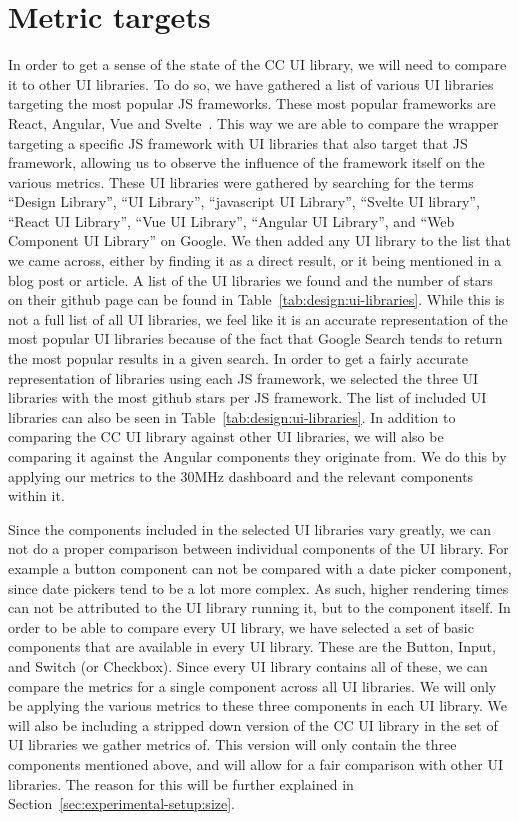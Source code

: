 \section{Metric targets}
In order to get a sense of the state of the CC UI library, we will need to compare it to other UI libraries. To do so, we have gathered a list of various UI libraries targeting the most popular JS frameworks. These most popular frameworks are React, Angular, Vue and Svelte~. This way we are able to compare the wrapper targeting a specific JS framework with UI libraries that also target that JS framework, allowing us to observe the influence of the framework itself on the various metrics. These UI libraries were gathered by searching for the terms ``Design Library'', ``UI Library'', ``javascript UI Library'', ``Svelte UI library'', ``React UI Library'', ``Vue UI Library'', ``Angular UI Library'', and ``Web Component UI Library'' on Google. We then added any UI library to the list that we came across, either by finding it as a direct result, or it being mentioned in a blog post or article. A list of the UI libraries we found and the number of stars on their github page can be found in Table~\ref{tab:design:ui-libraries}. While this is not a full list of all UI libraries, we feel like it is an accurate representation of the most popular UI libraries because of the fact that Google Search tends to return the most popular results in a given search. In order to get a fairly accurate representation of libraries using each JS framework, we selected the three UI libraries with the most github stars per JS framework. The list of included UI libraries can also be seen in Table~\ref{tab:design:ui-libraries}. In addition to comparing the CC UI library against other UI libraries, we will also be comparing it against the Angular components they originate from. We do this by applying our metrics to the 30MHz dashboard and the relevant components within it.

Since the components included in the selected UI libraries vary greatly, we can not do a proper comparison between individual components of the UI library. For example a button component can not be compared with a date picker component, since date pickers tend to be a lot more complex. As such, higher rendering times can not be attributed to the UI library running it, but to the component itself. In order to be able to compare every UI library, we have selected a set of basic components that are available in every UI library. These are the Button, Input, and Switch (or Checkbox). Since every UI library contains all of these, we can compare the metrics for a single component across all UI libraries. We will only be applying the various metrics to these three components in each UI library. We will also be including a stripped down version of the CC UI library in the set of UI libraries we gather metrics of. This version will only contain the three components mentioned above, and will allow for a fair comparison with other UI libraries. The reason for this will be further explained in Section~\ref{sec:experimental-setup:size}.


